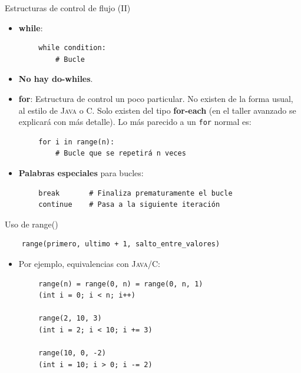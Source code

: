 \documentclass[10pt]{beamer} %
\begin{document}
\begin{frame}[fragile]{Estructuras de control de flujo (II)}
    \begin{itemize}
        \item \textbf{while}:
    \end{itemize}
    \begin{verbatim}
        while condition:
            # Bucle
    \end{verbatim}
    \begin{itemize}
        \item \textbf{No hay do-whiles}.
        \item \textbf{for}: Estructura de control un poco particular. No existen de la forma usual, al estilo de \textsc{Java} o \textsc{C}. Solo existen del tipo \textbf{for-each} (en el taller avanzado se explicará con más detalle). Lo más parecido a un \texttt{for} normal es:
    \end{itemize}
    \begin{verbatim}
        for i in range(n):
            # Bucle que se repetirá n veces
    \end{verbatim}
    \begin{itemize}
        \item \textbf{Palabras especiales} para bucles:
    \end{itemize}
    \begin{verbatim}
        break       # Finaliza prematuramente el bucle
        continue    # Pasa a la siguiente iteración
    \end{verbatim}
\end{frame}

\begin{frame}[fragile]{Uso de range()}
    \begin{verbatim}
    range(primero, ultimo + 1, salto_entre_valores)
    \end{verbatim}
    \begin{itemize}
        \item Por ejemplo, equivalencias con \textsc{Java}/\textsc{C}:
    \end{itemize}
    \begin{verbatim}
        range(n) = range(0, n) = range(0, n, 1)
        (int i = 0; i < n; i++)
    
        range(2, 10, 3)
        (int i = 2; i < 10; i += 3)
        
        range(10, 0, -2)
        (int i = 10; i > 0; i -= 2)
    \end{verbatim}
\end{frame}
\end{document}
